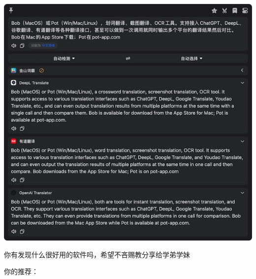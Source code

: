 \begin{itemize}
\begin{enumerate}
        \includegraphics[width=0.8\columnwidth]{author-folder/Kai.Wu/Bob.jpg}
    \end{enumerate}
\end{itemize}

你有发现什么很好用的软件吗，希望不吝赐教分享给学弟学妹

你的推荐：